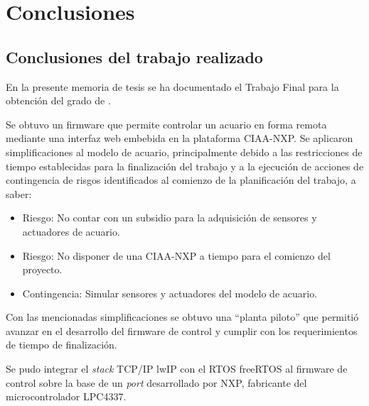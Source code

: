 
\chapter{Conclusiones} %

\label{Chapter5} %




\section{Conclusiones del trabajo realizado}

En la presente memoria de tesis se ha documentado el Trabajo Final para la obtención del grado de \degreename.  

Se obtuvo un firmware que permite controlar un acuario en forma remota mediante una interfaz web embebida en la plataforma CIAA-NXP. Se aplicaron simplificaciones al modelo de acuario, principalmente debido a las restricciones de tiempo establecidas para la finalización del trabajo y a la ejecución de acciones de contingencia de risgos identificados al comienzo de la planificación del trabajo, a saber:

\begin{itemize}
	\item Riesgo: No contar con un subsidio para la adquisición de sensores y actuadores de acuario.
	\item Riesgo: No disponer de una CIAA-NXP a tiempo para el comienzo del proyecto.
	\item Contingencia:  Simular sensores y actuadores del modelo de acuario.
\end{itemize}

Con las mencionadas simplificaciones se obtuvo una ``planta piloto'' que permitió avanzar en el desarrollo del firmware de control y cumplir con los requerimientos de tiempo de finalización.

Se pudo integrar el \textit{stack} TCP/IP lwIP con el RTOS freeRTOS al firmware de control sobre la base de un \textit{port} desarrollado por NXP, fabricante del microcontrolador LPC4337.

